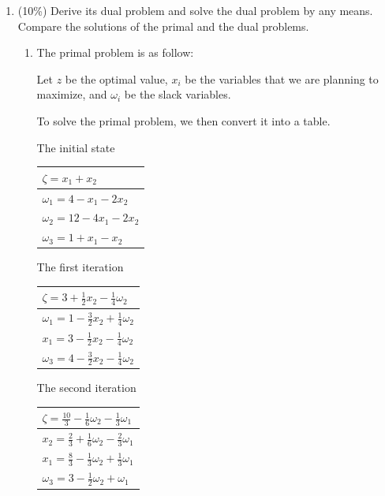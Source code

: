 \documentclass[a4paper,10pt]{article}
\begin{document}
\begin{enumerate}
\begin{enumerate}
        \item (10\%) Derive its dual problem and solve the dual problem by any means. Compare the solutions of the primal and the dual problems.
        {\color{blue} 
            \begin{enumerate}
            \item The primal problem is as follow:

                Let $z$ be the optimal value, $x_i$ be the variables that we are planning to maximize, and $\omega_i$ be the slack variables.
                
                To solve the primal problem, we then convert it into a table. 
    
                The initial state
                \begin{center}
                    \begin{tabular}{ l } 
                        $ \zeta = x_1 + x_2 $ \\
                        \hline
                        $ \omega_1 = 4 - x_1 - 2x_2 $ \\
                        $ \omega_2 = 12 - 4x_1 - 2x_2 $ \\
                        $ \omega_3 = 1 + x_1 - x_2 $
                    \end{tabular}
                \end{center}
                
                The first iteration
                \begin{center}
                    \begin{tabular}{ l } 
                        $\zeta = 3 + \frac{1}{2}x_2 - \frac{1}{4}\omega_2$ \\
                        \hline
                        $\omega_1 = 1 - \frac{3}{2}x_2 + \frac{1}{4}\omega_2$ \\
                        $x_1 = 3 - \frac{1}{2}x_2 - \frac{1}{4}\omega_2$ \\
                        $\omega_3 = 4 - \frac{3}{2}x_2 - \frac{1}{4}\omega_2$ \\
                    \end{tabular}
                \end{center}
    
                The second iteration
                \begin{center}
                    \begin{tabular}{ l } 
                        $\zeta = \frac{10}{3} - \frac{1}{6}\omega_2 - \frac{1}{3}\omega_1$ \\
                        \hline
                        $x_2 = \frac{2}{3} + \frac{1}{6}\omega_2 - \frac{2}{3}\omega_1$ \\
                        $x_1 = \frac{8}{3} - \frac{1}{3}\omega_2 + \frac{1}{3}\omega_1$ \\
                        $\omega_3 = 3 - \frac{1}{2}\omega_2 + \omega_1$ \\
                    \end{tabular}
                \end{center}


\end{enumerate}}
\end{enumerate}
\end{enumerate}
\end{document}
